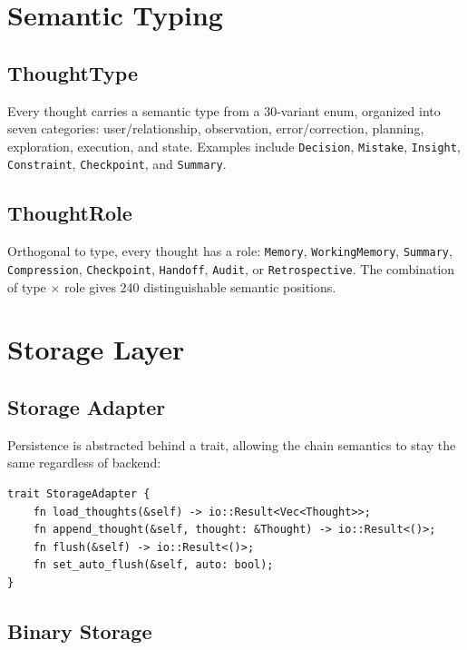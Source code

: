 \documentclass[11pt,a4paper]{article}
\begin{document}
\section{Semantic Typing}

\subsection{ThoughtType}

Every thought carries a semantic type from a 30-variant enum, organized into seven
categories: user/relationship, observation, error/correction, planning, exploration,
execution, and state. Examples include \texttt{Decision}, \texttt{Mistake},
\texttt{Insight}, \texttt{Constraint}, \texttt{Checkpoint}, and \texttt{Summary}.

\subsection{ThoughtRole}

Orthogonal to type, every thought has a role: \texttt{Memory}, \texttt{WorkingMemory},
\texttt{Summary}, \texttt{Compression}, \texttt{Checkpoint}, \texttt{Handoff},
\texttt{Audit}, or \texttt{Retrospective}. The combination of type $\times$ role gives
240 distinguishable semantic positions.

\section{Storage Layer}

\subsection{Storage Adapter}

Persistence is abstracted behind a trait, allowing the chain semantics to stay the same
regardless of backend:

\begin{lstlisting}
trait StorageAdapter {
    fn load_thoughts(&self) -> io::Result<Vec<Thought>>;
    fn append_thought(&self, thought: &Thought) -> io::Result<()>;
    fn flush(&self) -> io::Result<()>;
    fn set_auto_flush(&self, auto: bool);
}
\end{lstlisting}

\subsection{Binary Storage}
\end{document}
